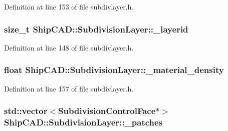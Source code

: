 Definition at line 153 of file subdivlayer.\-h.

\hypertarget{classShipCAD_1_1SubdivisionLayer_a73e4956d179d6ebd6c062e7e76bca196}{
\subsubsection[{\-\_\-layerid}]{\setlength{\rightskip}{0pt plus 5cm}size\-\_\-t Ship\-C\-A\-D\-::\-Subdivision\-Layer\-::\-\_\-layerid\hspace{0.3cm}{\ttfamily [protected]}}}\label{classShipCAD_1_1SubdivisionLayer_a73e4956d179d6ebd6c062e7e76bca196}


Definition at line 148 of file subdivlayer.\-h.

\hypertarget{classShipCAD_1_1SubdivisionLayer_adfdd4e996a5be7147a2eeb682dd93ff8}{
\subsubsection[{\-\_\-material\-\_\-density}]{\setlength{\rightskip}{0pt plus 5cm}float Ship\-C\-A\-D\-::\-Subdivision\-Layer\-::\-\_\-material\-\_\-density\hspace{0.3cm}{\ttfamily [protected]}}}\label{classShipCAD_1_1SubdivisionLayer_adfdd4e996a5be7147a2eeb682dd93ff8}


Definition at line 157 of file subdivlayer.\-h.

\hypertarget{classShipCAD_1_1SubdivisionLayer_a98b25b86a7104e4f987d34506438113f}{
\subsubsection[{\-\_\-patches}]{\setlength{\rightskip}{0pt plus 5cm}std\-::vector$<${\bf Subdivision\-Control\-Face}$\ast$$>$ Ship\-C\-A\-D\-::\-Subdivision\-Layer\-::\-\_\-patches\hspace{0.3cm}{\ttfamily [protected]}}}\label{classShipCAD_1_1SubdivisionLayer_a98b25b86a7104e4f987d34506438113f}


